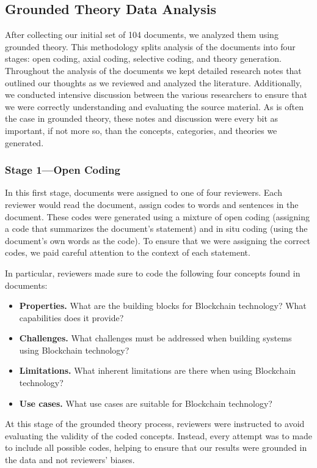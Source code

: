 \subsection{Grounded Theory Data Analysis}
After collecting our initial set of 104 documents, we analyzed them using grounded theory.
This methodology splits analysis of the documents into four stages: open coding, axial coding, selective coding, and theory generation.
Throughout the analysis of the documents we kept detailed research notes that outlined our thoughts as we reviewed and analyzed the literature.
Additionally, we conducted intensive discussion between the various researchers to ensure that we were correctly understanding and evaluating the source material.
As is often the case in grounded theory, these notes and discussion were every bit as important, if not more so, than the concepts, categories, and theories we generated.

\subsubsection{Stage 1---Open Coding}
In this first stage, documents were assigned to one of four reviewers.
Each reviewer would read the document, assign codes to words and sentences in the document.
These codes were generated using a mixture of open coding (assigning a code that summarizes the document's statement) and in situ coding (using the document's own words as the code).
To ensure that we were assigning the correct codes, we paid careful attention to the context of each statement.

In particular, reviewers made sure to code the following four concepts found in documents:
 \renewcommand{\labelitemi}{$\blacksquare$}
\begin{itemize}
	\item \textbf{Properties.} What are the building blocks for Blockchain technology? What capabilities does it provide?
	\item \textbf{Challenges.} What challenges must be addressed when building systems using Blockchain technology?
	\item \textbf{Limitations.} What inherent limitations are there when using Blockchain technology?
	\item \textbf{Use cases.} What use cases are suitable for Blockchain technology?
\end{itemize}
 \renewcommand{\labelitemi}{\textbullet}

At this stage of the grounded theory process, reviewers were instructed to avoid evaluating the validity of the coded concepts.
Instead, every attempt was to made to include all possible codes, helping to ensure that our results were grounded in the data and not reviewers' biases.


